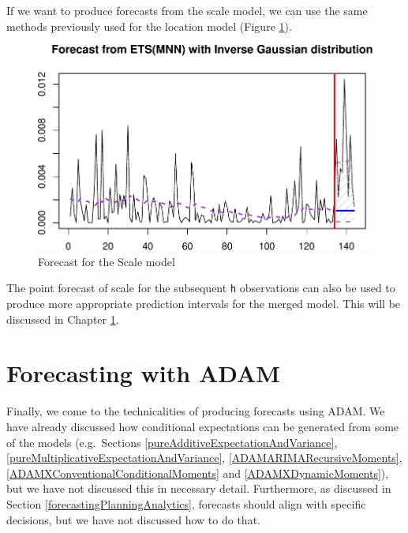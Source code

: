 \documentclass[
]{book}
\newenvironment{Shaded}{\begin{snugshade}}{\end{snugshade}}
\newcommand{\AttributeTok}[1]{\textcolor[rgb]{0.77,0.63,0.00}{#1}}
\newcommand{\DecValTok}[1]{\textcolor[rgb]{0.00,0.00,0.81}{#1}}
\newcommand{\FunctionTok}[1]{\textcolor[rgb]{0.00,0.00,0.00}{#1}}
\newcommand{\NormalTok}[1]{#1}
\newcommand{\SpecialCharTok}[1]{\textcolor[rgb]{0.00,0.00,0.00}{#1}}
\newcommand{\StringTok}[1]{\textcolor[rgb]{0.31,0.60,0.02}{#1}}
\theoremstyle{definition}
\theoremstyle{definition}
\theoremstyle{definition}
\theoremstyle{definition}
\theoremstyle{remark}
\begin{document}
If we want to produce forecasts from the scale model, we can use the same methods previously used for the location model (Figure \ref{fig:adamModelAirScaleForecast}).

\begin{Shaded}
\end{Shaded}

\begin{figure}
\centering
\includegraphics{Svetunkov--2022----ADAM_files/figure-latex/adamModelAirScaleForecast-1.pdf}
\caption{\label{fig:adamModelAirScaleForecast}Forecast for the Scale model}
\end{figure}

The point forecast of scale for the subsequent \texttt{h} observations can also be used to produce more appropriate prediction intervals for the merged model. This will be discussed in Chapter \ref{ADAMForecasting}.

\hypertarget{ADAMForecasting}{%
\chapter{Forecasting with ADAM}\label{ADAMForecasting}}

Finally, we come to the technicalities of producing forecasts using ADAM. We have already discussed how conditional expectations can be generated from some of the models (e.g.~Sections \ref{pureAdditiveExpectationAndVariance}, \ref{pureMultiplicativeExpectationAndVariance}, \ref{ADAMARIMARecursiveMoments}, \ref{ADAMXConventionalConditionalMoments} and \ref{ADAMXDynamicMoments}), but we have not discussed this in necessary detail. Furthermore, as discussed in Section \ref{forecastingPlanningAnalytics}, forecasts should align with specific decisions, but we have not discussed how to do that.
\end{document}
